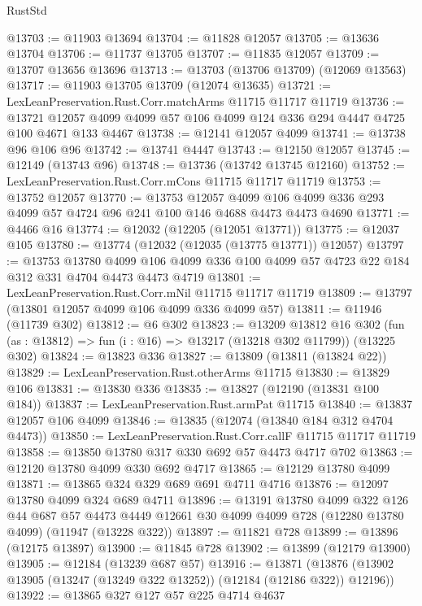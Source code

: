 \begin{lexlean}{RustStd}
\begin{coremodule}
@13703 := @11903 @13694
@13704 := @11828 @12057
@13705 := @13636 @13704
@13706 := @11737 @13705
@13707 := @11835 @12057
@13709 := @13707 @13656 @13696
@13713 := @13703 (@13706 @13709) (@12069 @13563)
@13717 := @11903 @13705 @13709 (@12074 @13635)
@13721 := LexLeanPreservation.Rust.Corr.matchArms @11715 @11717 @11719
@13736 := @13721 @12057 @4099 @4099 @57 @106 @4099 @124 @336 @294 @4447 @4725 @100 @4671 @133 @4467
@13738 := @12141 @12057 @4099
@13741 := @13738 @96 @106 @96
@13742 := @13741 @4447
@13743 := @12150 @12057
@13745 := @12149 (@13743 @96)
@13748 := @13736 (@13742 @13745 @12160)
@13752 := LexLeanPreservation.Rust.Corr.mCons @11715 @11717 @11719
@13753 := @13752 @12057
@13770 := @13753
    @12057
    @4099
    @106
    @4099
    @336
    @293
    @4099
    @57
    @4724
    @96
    @241
    @100
    @146
    @4688
    @4473
    @4473
    @4690
@13771 := @4466 @16
@13774 := @12032 (@12205 (@12051 @13771))
@13775 := @12037 @105
@13780 := @13774 (@12032 (@12035 (@13775 @13771)) @12057)
@13797 := @13753
    @13780
    @4099
    @106
    @4099
    @336
    @100
    @4099
    @57
    @4723
    @22
    @184
    @312
    @331
    @4704
    @4473
    @4473
    @4719
@13801 := LexLeanPreservation.Rust.Corr.mNil @11715 @11717 @11719
@13809 := @13797 (@13801 @12057 @4099 @106 @4099 @336 @4099 @57)
@13811 := @11946 (@11739 @302)
@13812 := @6 @302
@13823 := @13209
    @13812
    @16
    @302
    (fun (as : @13812) => fun (i : @16) => @13217 (@13218 @302 @11799))
    (@13225 @302)
@13824 := @13823 @336
@13827 := @13809 (@13811 (@13824 @22))
@13829 := LexLeanPreservation.Rust.otherArms @11715
@13830 := @13829 @106
@13831 := @13830 @336
@13835 := @13827 (@12190 (@13831 @100 @184))
@13837 := LexLeanPreservation.Rust.armPat @11715
@13840 := @13837 @12057 @106 @4099
@13846 := @13835 (@12074 (@13840 @184 @312 @4704 @4473))
@13850 := LexLeanPreservation.Rust.Corr.callF @11715 @11717 @11719
@13858 := @13850 @13780 @317 @330 @692 @57 @4473 @4717 @702
@13863 := @12120 @13780 @4099 @330 @692 @4717
@13865 := @12129 @13780 @4099
@13871 := @13865 @324 @329 @689 @691 @4711 @4716
@13876 := @12097 @13780 @4099 @324 @689 @4711
@13896 := @13191
    @13780
    @4099
    @322
    @126
    @44
    @687
    @57
    @4473
    @4449
    @12661
    @30
    @4099
    @4099
    @728
    (@12280 @13780 @4099)
    (@11947 (@13228 @322))
@13897 := @11821 @728
@13899 := @13896 (@12175 @13897)
@13900 := @11845 @728
@13902 := @13899 (@12179 @13900)
@13905 := @12184 (@13239 @687 @57)
@13916 := @13871
    (@13876 (@13902 @13905 (@13247 (@13249 @322 @13252)) (@12184 (@12186 @322)) @12196))
@13922 := @13865 @327 @127 @57 @225 @4714 @4637

\end{coremodule}
\end{lexlean}
